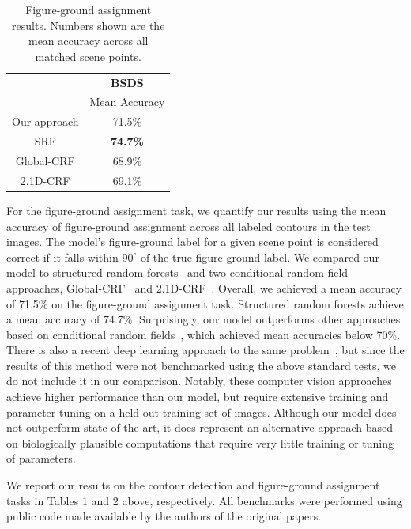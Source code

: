 \documentclass[12pt]{article}
\begin{document}
\begin{table}[h!]
\centering
\begin{tabular}{|c|c|} 
 \cline{2-2}
 \multicolumn{1}{c}{} & \multicolumn{1}{|c|}{\textbf{BSDS}} \\
\cline{2-2}
 \multicolumn{1}{c|}{} & Mean Accuracy \\ 
 \hline
  Our approach & 71.5\% \\
 SRF & \textbf{74.7\%} \\
 Global-CRF & 68.9\% \\
 2.1D-CRF & 69.1\% \\
 \hline
\end{tabular}
\caption{Figure-ground assignment results. Numbers shown are the mean accuracy across all matched scene points.}
\label{tbl:Table2}
\end{table}

For the figure-ground assignment task, we quantify our results using the mean accuracy of figure-ground assignment across all labeled contours in the test images. The model's figure-ground label for a given scene point is considered correct if it falls within $90^{\circ}$ of the true figure-ground label. We compared our model to structured random forests~\citep[][SRF]{Teo_etal15} and two conditional random field approaches, Global-CRF~\citep{Ren_etal06} and 2.1D-CRF~\citep{Leichter_Lindenbaum09}. Overall, we achieved a mean accuracy of 71.5\% on the figure-ground assignment task. Structured random forests achieve a mean accuracy of 74.7\%. Surprisingly, our model outperforms other approaches based on conditional random fields~\citep{Ren_etal06,Leichter_Lindenbaum09}, which achieved mean accuracies below 70\%. There is also a recent deep learning approach to the same problem~\citep{Wang_Yuille16}, but since the results of this method were not benchmarked using the above standard tests, we do not include it in our comparison. Notably, these computer vision approaches achieve higher performance than our model, but require extensive training and parameter tuning on a held-out training set of images. Although our model does not outperform state-of-the-art, it does represent an alternative approach based on biologically plausible computations that require very little training or tuning of parameters.

We report our results on the contour detection and figure-ground assignment tasks in Tables 1 and 2 above, respectively. All benchmarks were performed using public code made available by the authors of the original papers.
\end{document}
